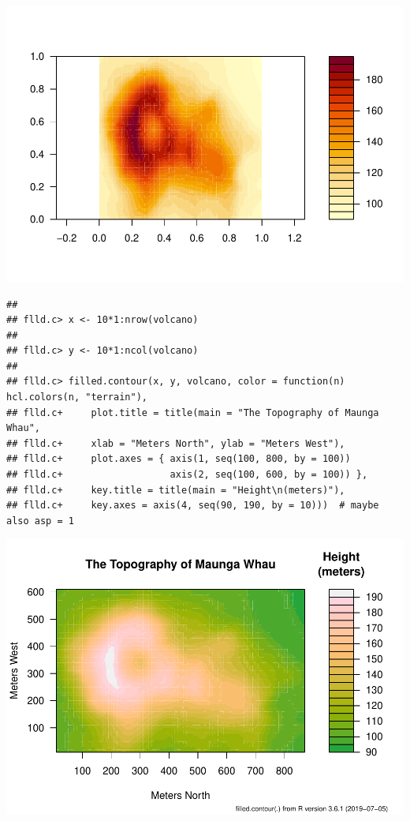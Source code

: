 \documentclass[]{book}
\begin{document}
\includegraphics{TudodoR_files/figure-latex/unnamed-chunk-145-4.pdf}

\begin{verbatim}
## 
## flld.c> x <- 10*1:nrow(volcano)
## 
## flld.c> y <- 10*1:ncol(volcano)
## 
## flld.c> filled.contour(x, y, volcano, color = function(n) hcl.colors(n, "terrain"),
## flld.c+     plot.title = title(main = "The Topography of Maunga Whau",
## flld.c+     xlab = "Meters North", ylab = "Meters West"),
## flld.c+     plot.axes = { axis(1, seq(100, 800, by = 100))
## flld.c+                   axis(2, seq(100, 600, by = 100)) },
## flld.c+     key.title = title(main = "Height\n(meters)"),
## flld.c+     key.axes = axis(4, seq(90, 190, by = 10)))  # maybe also asp = 1
\end{verbatim}

\includegraphics{TudodoR_files/figure-latex/unnamed-chunk-145-5.pdf}
\end{document}
